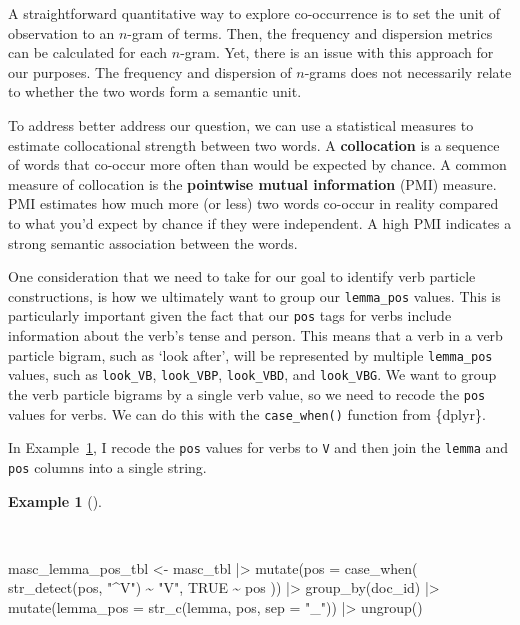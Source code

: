 \documentclass[
  letterpaper,
]{book}
\newenvironment{Shaded}{\begin{snugshade}}{\end{snugshade}}
\newcommand{\AttributeTok}[1]{\textcolor[rgb]{0.00,0.00,0.00}{#1}}
\newcommand{\ConstantTok}[1]{\textcolor[rgb]{0.00,0.00,0.00}{#1}}
\newcommand{\FunctionTok}[1]{\textcolor[rgb]{0.00,0.00,0.00}{#1}}
\newcommand{\NormalTok}[1]{\textcolor[rgb]{0.00,0.00,0.00}{#1}}
\newcommand{\OtherTok}[1]{\textcolor[rgb]{0.00,0.00,0.00}{#1}}
\newcommand{\SpecialCharTok}[1]{\textcolor[rgb]{0.00,0.00,0.00}{#1}}
\newcommand{\StringTok}[1]{\textcolor[rgb]{0.00,0.00,0.00}{#1}}
\theoremstyle{definition}
\newtheorem{example}{Example}[chapter]
\theoremstyle{remark}
\begin{document}
A straightforward quantitative way to explore co-occurrence is to set
the unit of observation to an \(n\)-gram of terms. Then, the frequency
and dispersion metrics can be calculated for each \(n\)-gram. Yet, there
is an issue with this approach for our purposes. The frequency and
dispersion of \(n\)-grams does not necessarily relate to whether the two
words form a semantic unit.

To address better address our question, we can use a statistical
measures to estimate collocational strength between two words. A
\textbf{collocation} is a sequence of words that co-occur more often
than would be expected by chance. A common measure of collocation is the
\textbf{pointwise mutual information} (PMI) measure. PMI estimates how
much more (or less) two words co-occur in reality compared to what you'd
expect by chance if they were independent. A high PMI indicates a strong
semantic association between the words.

One consideration that we need to take for our goal to identify verb
particle constructions, is how we ultimately want to group our
\texttt{lemma\_pos} values. This is particularly important given the
fact that our \texttt{pos} tags for verbs include information about the
verb's tense and person. This means that a verb in a verb particle
bigram, such as `look after', will be represented by multiple
\texttt{lemma\_pos} values, such as \texttt{look\_VB},
\texttt{look\_VBP}, \texttt{look\_VBD}, and \texttt{look\_VBG}. We want
to group the verb particle bigrams by a single verb value, so we need to
recode the \texttt{pos} values for verbs. We can do this with the
\texttt{case\_when()} function from \{dplyr\}.

In Example~\ref{exm-explore-masc-lemma-pos}, I recode the \texttt{pos}
values for verbs to \texttt{V} and then join the \texttt{lemma} and
\texttt{pos} columns into a single string.

\begin{example}[]\protect\hypertarget{exm-explore-masc-lemma-pos}{}\label{exm-explore-masc-lemma-pos}

~

\begin{Shaded}
\begin{Highlighting}[]
\NormalTok{masc\_lemma\_pos\_tbl }\OtherTok{\textless{}{-}}
\NormalTok{  masc\_tbl }\SpecialCharTok{|\textgreater{}}
  \FunctionTok{mutate}\NormalTok{(}\AttributeTok{pos =} \FunctionTok{case\_when}\NormalTok{(}
    \FunctionTok{str\_detect}\NormalTok{(pos, }\StringTok{"\^{}V"}\NormalTok{) }\SpecialCharTok{\textasciitilde{}} \StringTok{"V"}\NormalTok{,}
    \ConstantTok{TRUE} \SpecialCharTok{\textasciitilde{}}\NormalTok{ pos}
\NormalTok{  )) }\SpecialCharTok{|\textgreater{}}
  \FunctionTok{group\_by}\NormalTok{(doc\_id) }\SpecialCharTok{|\textgreater{}}
  \FunctionTok{mutate}\NormalTok{(}\AttributeTok{lemma\_pos =} \FunctionTok{str\_c}\NormalTok{(lemma, pos, }\AttributeTok{sep =} \StringTok{"\_"}\NormalTok{)) }\SpecialCharTok{|\textgreater{}}
  \FunctionTok{ungroup}\NormalTok{()}
\end{Highlighting}
\end{Shaded}

\end{example}
\end{document}
